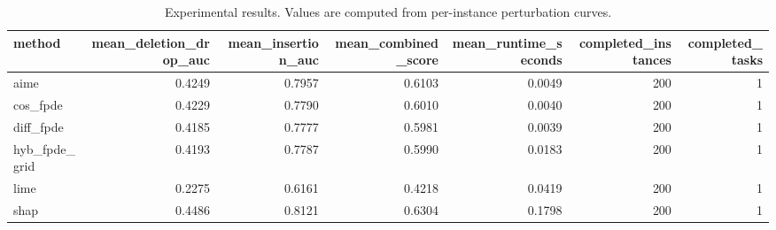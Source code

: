 \begin{table}[t]
\caption{Experimental results. Values are computed from per-instance perturbation curves.}
\label{tab:main_results_computed}
\centering
\begin{tabular}{lrrrrrr}
\toprule
method & mean\_deletion\_drop\_auc & mean\_insertion\_auc & mean\_combined\_score & mean\_runtime\_seconds & completed\_instances & completed\_tasks \\
\midrule
aime & 0.4249 & 0.7957 & 0.6103 & 0.0049 & 200 & 1 \\
cos\_fpde & 0.4229 & 0.7790 & 0.6010 & 0.0040 & 200 & 1 \\
diff\_fpde & 0.4185 & 0.7777 & 0.5981 & 0.0039 & 200 & 1 \\
hyb\_fpde\_grid & 0.4193 & 0.7787 & 0.5990 & 0.0183 & 200 & 1 \\
lime & 0.2275 & 0.6161 & 0.4218 & 0.0419 & 200 & 1 \\
shap & 0.4486 & 0.8121 & 0.6304 & 0.1798 & 200 & 1 \\
\bottomrule
\end{tabular}

\end{table}
